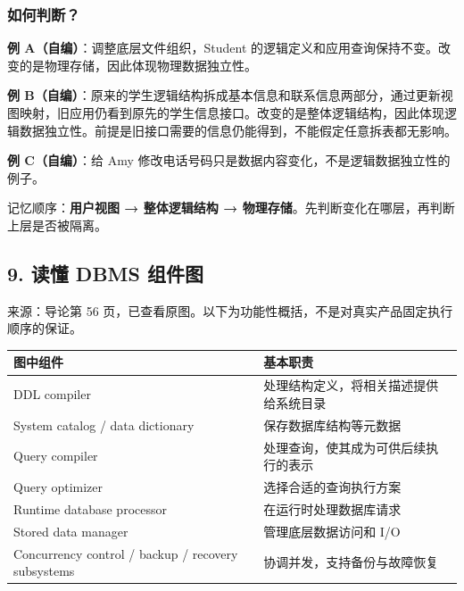 \subsubsection{如何判断？}\label{01_database_fundamentals_zh-ux5982ux4f55ux5224ux65ad}

\textbf{例 A（自编）}：调整底层文件组织，Student 的逻辑定义和应用查询保持不变。改变的是物理存储，因此体现物理数据独立性。

\textbf{例 B（自编）}：原来的学生逻辑结构拆成基本信息和联系信息两部分，通过更新视图映射，旧应用仍看到原先的学生信息接口。改变的是整体逻辑结构，因此体现逻辑数据独立性。前提是旧接口需要的信息仍能得到，不能假定任意拆表都无影响。

\textbf{例 C（自编）}：给 Amy 修改电话号码只是数据内容变化，不是逻辑数据独立性的例子。

记忆顺序：\textbf{用户视图 → 整体逻辑结构 → 物理存储}。先判断变化在哪层，再判断上层是否被隔离。

\Needspace{11cm}
\subsection{9. 读懂 DBMS 组件图}\label{01_database_fundamentals_zh-ux8bfbux61c2-dbms-ux7ec4ux4ef6ux56fe}


来源：导论第 56 页，已查看原图。以下为功能性概括，不是对真实产品固定执行顺序的保证。

\begin{longtable}[]{@{}
  >{\raggedright\arraybackslash}p{}
  >{\raggedright\arraybackslash}p{}@{}}
\toprule\noalign{}
\begin{minipage}[b]{\linewidth}\raggedright
图中组件
\end{minipage} & \begin{minipage}[b]{\linewidth}\raggedright
基本职责
\end{minipage} \\
\midrule\noalign{}
\endhead
\bottomrule\noalign{}
\endlastfoot
DDL compiler & 处理结构定义，将相关描述提供给系统目录 \\
System catalog / data dictionary & 保存数据库结构等元数据 \\
Query compiler & 处理查询，使其成为可供后续执行的表示 \\
Query optimizer & 选择合适的查询执行方案 \\
Runtime database processor & 在运行时处理数据库请求 \\
Stored data manager & 管理底层数据访问和 I/O \\
Concurrency control / backup / recovery subsystems & 协调并发，支持备份与故障恢复 \\
\end{longtable}

